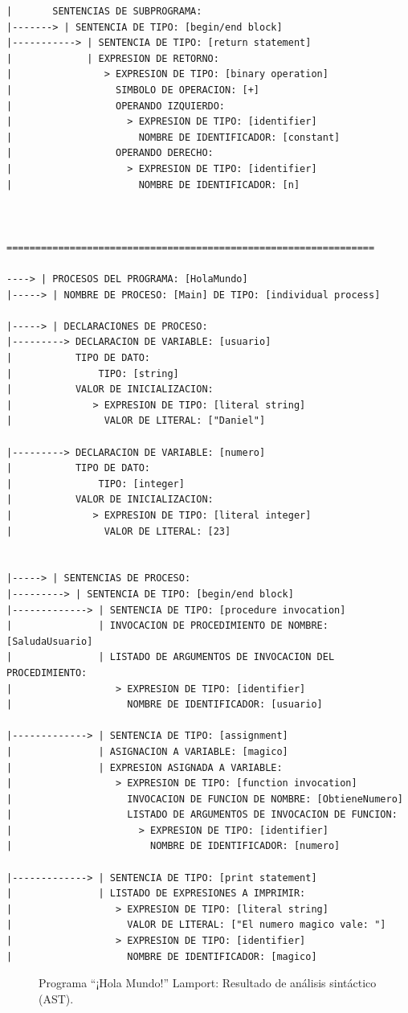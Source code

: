 \begin{verbatim}
|       SENTENCIAS DE SUBPROGRAMA:
|-------> | SENTENCIA DE TIPO: [begin/end block]
|-----------> | SENTENCIA DE TIPO: [return statement]
|             | EXPRESION DE RETORNO:
|                > EXPRESION DE TIPO: [binary operation]
|                  SIMBOLO DE OPERACION: [+]
|                  OPERANDO IZQUIERDO:
|                    > EXPRESION DE TIPO: [identifier]
|                      NOMBRE DE IDENTIFICADOR: [constant]
|                  OPERANDO DERECHO:
|                    > EXPRESION DE TIPO: [identifier]
|                      NOMBRE DE IDENTIFICADOR: [n]



================================================================

----> | PROCESOS DEL PROGRAMA: [HolaMundo]
|-----> | NOMBRE DE PROCESO: [Main] DE TIPO: [individual process]

|-----> | DECLARACIONES DE PROCESO:
|---------> DECLARACION DE VARIABLE: [usuario]
|           TIPO DE DATO:
|               TIPO: [string]
|           VALOR DE INICIALIZACION:
|              > EXPRESION DE TIPO: [literal string]
|                VALOR DE LITERAL: ["Daniel"]

|---------> DECLARACION DE VARIABLE: [numero]
|           TIPO DE DATO:
|               TIPO: [integer]
|           VALOR DE INICIALIZACION:
|              > EXPRESION DE TIPO: [literal integer]
|                VALOR DE LITERAL: [23]


|-----> | SENTENCIAS DE PROCESO:
|---------> | SENTENCIA DE TIPO: [begin/end block]
|-------------> | SENTENCIA DE TIPO: [procedure invocation]
|               | INVOCACION DE PROCEDIMIENTO DE NOMBRE: [SaludaUsuario]
|               | LISTADO DE ARGUMENTOS DE INVOCACION DEL PROCEDIMIENTO:
|                  > EXPRESION DE TIPO: [identifier]
|                    NOMBRE DE IDENTIFICADOR: [usuario]

|-------------> | SENTENCIA DE TIPO: [assignment]
|               | ASIGNACION A VARIABLE: [magico]
|               | EXPRESION ASIGNADA A VARIABLE:
|                  > EXPRESION DE TIPO: [function invocation]
|                    INVOCACION DE FUNCION DE NOMBRE: [ObtieneNumero]
|                    LISTADO DE ARGUMENTOS DE INVOCACION DE FUNCION:
|                      > EXPRESION DE TIPO: [identifier]
|                        NOMBRE DE IDENTIFICADOR: [numero]

|-------------> | SENTENCIA DE TIPO: [print statement]
|               | LISTADO DE EXPRESIONES A IMPRIMIR:
|                  > EXPRESION DE TIPO: [literal string]
|                    VALOR DE LITERAL: ["El numero magico vale: "]
|                  > EXPRESION DE TIPO: [identifier]
|                    NOMBRE DE IDENTIFICADOR: [magico]
\end{verbatim}
\begin{figure}[hbtp]
\caption{Programa ``¡Hola Mundo!'' Lamport: Resultado de análisis sintáctico (AST).}
\label{fig:ASTHolaMundo}
\end{figure}

